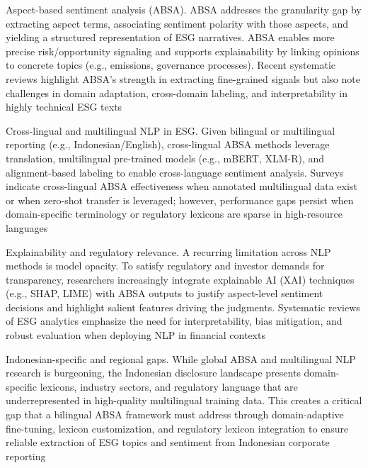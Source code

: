 Aspect-based sentiment analysis (ABSA). ABSA addresses the granularity gap by extracting aspect terms, associating sentiment polarity with those aspects, and yielding a structured representation of ESG narratives. ABSA enables more precise risk/opportunity signaling and supports explainability by linking opinions to concrete topics (e.g., emissions, governance processes). Recent systematic reviews highlight ABSA’s strength in extracting fine-grained signals but also note challenges in domain adaptation, cross-domain labeling, and interpretability in highly technical ESG texts \cite{10.1002/csr.70089,10.3390/math12193119,10.2139/ssrn.3738629,10.1111/eufm.12509,10.1109/access.2023.3348342}

Cross-lingual and multilingual NLP in ESG. Given bilingual or multilingual reporting (e.g., Indonesian/English), cross-lingual ABSA methods leverage translation, multilingual pre-trained models (e.g., mBERT, XLM-R), and alignment-based labeling to enable cross-language sentiment analysis. Surveys indicate cross-lingual ABSA effectiveness when annotated multilingual data exist or when zero-shot transfer is leveraged; however, performance gaps persist when domain-specific terminology or regulatory lexicons are sparse in high-resource languages \cite{10.1016/j.inffus.2025.103073,10.1111/eufm.12509,10.48550/arxiv.2511.00024}

Explainability and regulatory relevance. A recurring limitation across NLP methods is model opacity. To satisfy regulatory and investor demands for transparency, researchers increasingly integrate explainable AI (XAI) techniques (e.g., SHAP, LIME) with ABSA outputs to justify aspect-level sentiment decisions and highlight salient features driving the judgments. Systematic reviews of ESG analytics emphasize the need for interpretability, bias mitigation, and robust evaluation when deploying NLP in financial contexts \cite{10.1002/csr.70089,10.2139/ssrn.3738629,10.1108/mf-01-2023-0020}

Indonesian-specific and regional gaps. While global ABSA and multilingual NLP research is burgeoning, the Indonesian disclosure landscape presents domain-specific lexicons, industry sectors, and regulatory language that are underrepresented in high-quality multilingual training data. This creates a critical gap that a bilingual ABSA framework must address through domain-adaptive fine-tuning, lexicon customization, and regulatory lexicon integration to ensure reliable extraction of ESG topics and sentiment from Indonesian corporate reporting \cite{10.69593/ajbais.v4i04.130,10.1108/mf-01-2023-0020,10.1111/eufm.12509}

